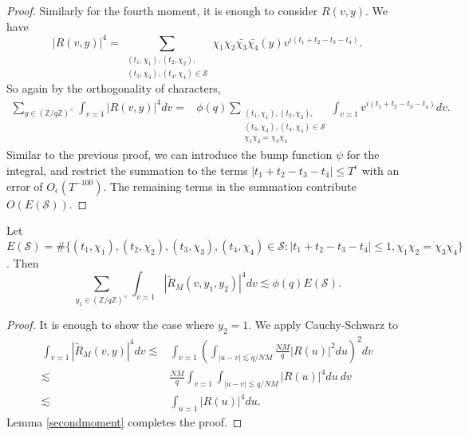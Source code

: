 \begin{proof}
    Similarly for the fourth moment, it is enough to consider $R(v,y)$. We have \[
    |R(v,y)|^4 = \sum_{\substack{(t_1,\chi_1),(t_2,\chi_2),\\ (t_3,\chi_3),(t_4,\chi_4)\in \mathcal{S}}}
    \chi_1{\chi}_2\bar{\chi_3}\bar{\chi_4}(y)v^{i(t_1+t_2-t_3-t_4)}.
    \]
    So again by the orthogonality of characters, \begin{align*}
        \sum_{y\in (\mathbb{Z}/q\mathbb{Z})^\times} \int_{v\asymp 1} 
        \left|R\left(v,y\right)\right|^4dv = & \phi(q)
        \sum_{\substack{(t_1,\chi_1),(t_2,\chi_2),\\ (t_3,\chi_3),(t_4,\chi_4)\in \mathcal{S}\\ \chi_1\chi_2=\chi_3\chi_4}} \int_{v\asymp 1} v^{i(t_1+t_2-t_3-t_4)} dv.
    \end{align*}
    Similar to the previous proof, we can introduce the bump function $\psi$ for the integral, and restrict the summation to the terms $|t_1+t_2-t_3-t_4|\leq T^\epsilon$ with an error of $O_\epsilon(T^{-100})$. The remaining terms in the summation contribute $O(E(\mathcal{S}))$.
\end{proof}
\begin{lemma}\label{fourthmoment_smooth}
    Let $E(\mathcal{S})=\#\{(t_1,\chi_1),(t_2,\chi_2),(t_3,\chi_3),(t_4,\chi_4)\in \mathcal{S}  :  |t_1+t_2-t_3-t_4|\leq 1, \chi_1\chi_2=\chi_3\chi_4\}$. Then \[
        \sum_{y_1\in (\mathbb{Z}/q\mathbb{Z})^\times} \int_{v\asymp 1} 
        \left|\tilde{R}_M\left(v,y_1,y_2\right)\right|^4dv  \lesssim \phi(q)E(\mathcal{S}).
    \]
\end{lemma}
\begin{proof}
    It is enough to show the case where $y_2=1$.
    We apply Cauchy-Schwarz to \begin{align*}
        \int_{v\asymp 1} 
        \left|\tilde{R}_M\left(v,y\right)\right|^4dv  \lesssim& \int_{v\asymp 1} 
        \left(\int_{|u-v|\lesssim q/NM}
        \frac{NM}{q}|R(u)|^2 du\right)^2
        dv \\
        \lesssim& \frac{NM}{q} \int_{v\asymp 1} 
       \int_{|u-v|\lesssim q/NM}
        |R(u)|^4 du \ 
        dv\\
        \lesssim&  
        \int_{u\asymp 1}
         |R(u)|^4 du.
    \end{align*}
    Lemma \ref{secondmoment} completes the proof.
\end{proof}
